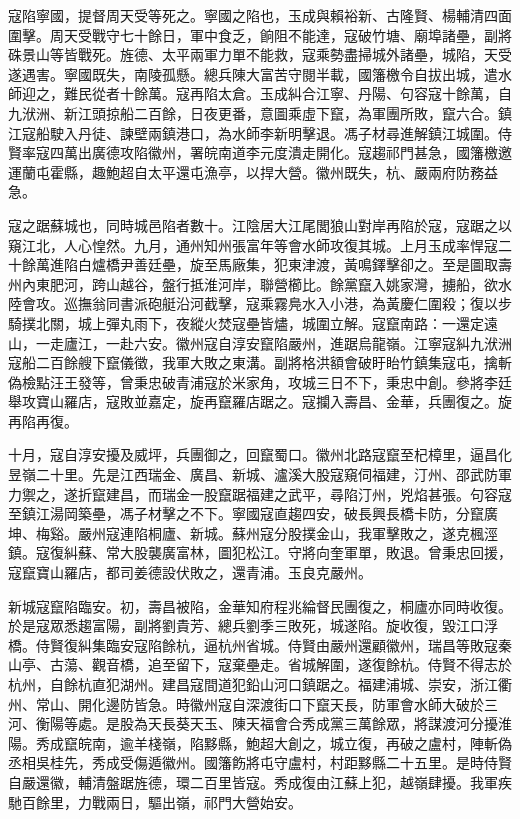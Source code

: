 \begin{pinyinscope}
寇陷寧國，提督周天受等死之。寧國之陷也，玉成與賴裕新、古隆賢、楊輔清四面圍擊。周天受戰守七十餘日，軍中食乏，餉阻不能達，寇破竹塘、廟埠諸壘，副將硃景山等皆戰死。旌德、太平兩軍力單不能救，寇乘勢盡掃城外諸壘，城陷，天受遂遇害。寧國既失，南陵孤懸。總兵陳大富苦守閱半載，國籓檄令自拔出城，遣水師迎之，難民從者十餘萬。寇再陷太倉。玉成糾合江寧、丹陽、句容寇十餘萬，自九洑洲、新江頭掠船二百餘，日夜更番，意圖乘虛下竄，為軍團所敗，竄六合。鎮江寇船駛入丹徒、諫壁兩鎮港口，為水師李新明擊退。馮子材尋進解鎮江城圍。侍賢率寇四萬出廣德攻陷徽州，署皖南道李元度潰走開化。寇趨祁門甚急，國籓檄邀運蘭屯霍縣，趣鮑超自太平還屯漁亭，以捍大營。徽州既失，杭、嚴兩府防務益急。

寇之踞蘇城也，同時城邑陷者數十。江陰居大江尾閭狼山對岸再陷於寇，寇踞之以窺江北，人心惶然。九月，通州知州張富年等會水師攻復其城。上月玉成率悍寇二十餘萬進陷白爐橋尹善廷壘，旋至馬廠集，犯東津渡，黃鳴鐸擊卻之。至是圖取壽州內東肥河，跨山越谷，盤行抵淮河岸，聯營櫛比。餘黨竄入姚家灣，擄船，欲水陸會攻。巡撫翁同書派砲艇沿河截擊，寇乘霧鳧水入小港，為黃慶仁圍殺；復以步騎撲北關，城上彈丸雨下，夜縱火焚寇壘皆燼，城圍立解。寇竄南路：一還定遠山，一走廬江，一赴六安。徽州寇自淳安竄陷嚴州，進踞烏龍嶺。江寧寇糾九洑洲寇船二百餘艘下竄儀徵，我軍大敗之東溝。副將格洪額會破盱眙竹鎮集寇屯，擒斬偽檢點汪王發等，曾秉忠破青浦寇於米家角，攻城三日不下，秉忠中創。參將李廷舉攻寶山羅店，寇敗並嘉定，旋再竄羅店踞之。寇攔入壽昌、金華，兵團復之。旋再陷再復。

十月，寇自淳安擾及威坪，兵團御之，回竄蜀口。徽州北路寇竄至杞樟里，逼昌化昱嶺二十里。先是江西瑞金、廣昌、新城、瀘溪大股寇窺伺福建，汀州、邵武防軍力禦之，遂折竄建昌，而瑞金一股竄踞福建之武平，尋陷汀州，兇焰甚張。句容寇至鎮江湯岡築壘，馮子材擊之不下。寧國寇直趨四安，破長興長橋卡防，分竄廣坤、梅谿。嚴州寇連陷桐廬、新城。蘇州寇分股撲金山，我軍擊敗之，遂克楓涇鎮。寇復糾蘇、常大股襲廣富林，圖犯松江。守將向奎軍單，敗退。曾秉忠回援，寇竄寶山羅店，都司姜德設伏敗之，還青浦。玉良克嚴州。

新城寇竄陷臨安。初，壽昌被陷，金華知府程兆綸督民團復之，桐廬亦同時收復。於是寇眾悉趨富陽，副將劉貴芳、總兵劉季三敗死，城遂陷。旋收復，毀江口浮橋。侍賢復糾集臨安寇陷餘杭，逼杭州省城。侍賢由嚴州還顧徽州，瑞昌等敗寇秦山亭、古蕩、觀音橋，追至留下，寇棄壘走。省城解圍，遂復餘杭。侍賢不得志於杭州，自餘杭直犯湖州。建昌寇間道犯鉛山河口鎮踞之。福建浦城、崇安，浙江衢州、常山、開化邊防皆急。時徽州寇自深渡街口下竄天長，防軍會水師大破於三河、衡陽等處。是股為天長葵天玉、陳天福會合秀成黨三萬餘眾，將謀渡河分擾淮陽。秀成竄皖南，逾羊棧嶺，陷黟縣，鮑超大創之，城立復，再破之盧村，陣斬偽丞相吳桂先，秀成受傷遁徽州。國籓飭將屯守盧村，村距黟縣二十五里。是時侍賢自嚴還徽，輔清盤踞旌德，環二百里皆寇。秀成復由江蘇上犯，越嶺肆擾。我軍疾馳百餘里，力戰兩日，驅出嶺，祁門大營始安。


\end{pinyinscope}
